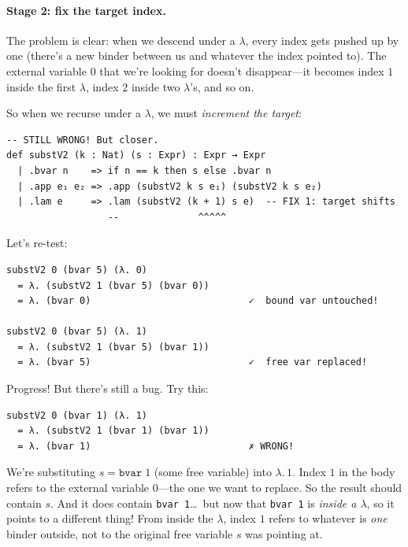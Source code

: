 \documentclass[11pt,a4paper]{article}
\theoremstyle{definition}
\newcommand{\lam}{\lambda}
\begin{document}
\paragraph{Stage 2: fix the target index.}

The problem is clear: when we descend under a $\lam$, every index gets pushed
up by one (there's a new binder between us and whatever the index pointed to).
The external variable $0$ that we're looking for doesn't disappear---it becomes
index $1$ inside the first $\lam$, index $2$ inside two $\lam$'s, and so on.

So when we recurse under a $\lam$, we must \emph{increment the target}:

\begin{verbatim}
-- STILL WRONG! But closer.
def substV2 (k : Nat) (s : Expr) : Expr → Expr
  | .bvar n    => if n == k then s else .bvar n
  | .app e₁ e₂ => .app (substV2 k s e₁) (substV2 k s e₂)
  | .lam e     => .lam (substV2 (k + 1) s e)  -- FIX 1: target shifts
                  --              ^^^^^
\end{verbatim}

Let's re-test:

\begin{verbatim}
substV2 0 (bvar 5) (λ. 0)
  = λ. (substV2 1 (bvar 5) (bvar 0))
  = λ. (bvar 0)                            ✓  bound var untouched!

substV2 0 (bvar 5) (λ. 1)
  = λ. (substV2 1 (bvar 5) (bvar 1))
  = λ. (bvar 5)                            ✓  free var replaced!
\end{verbatim}

Progress! But there's still a bug. Try this:

\begin{verbatim}
substV2 0 (bvar 1) (λ. 1)
  = λ. (substV2 1 (bvar 1) (bvar 1))
  = λ. (bvar 1)                            ✗ WRONG!
\end{verbatim}

We're substituting $s = \texttt{bvar}\;1$ (some free variable) into
$\lam.\, 1$. Index $1$ in the body refers to the external variable $0$---the
one we want to replace. So the result should contain $s$. And it does contain
\texttt{bvar 1}\ldots\ but now that \texttt{bvar 1} is \emph{inside a
$\lam$}, so it points to a different thing! From inside the $\lam$, index $1$
refers to whatever is \emph{one} binder outside, not to the original free
variable $s$ was pointing at.
\end{document}

